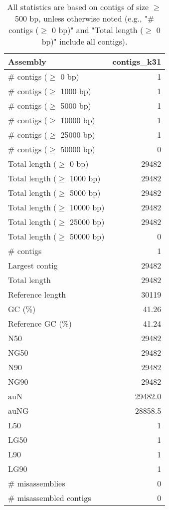 \documentclass[12pt,a4paper]{article}
\begin{document}
\begin{table}[ht]
\begin{center}
\caption{All statistics are based on contigs of size $\geq$ 500 bp, unless otherwise noted (e.g., "\# contigs ($\geq$ 0 bp)" and "Total length ($\geq$ 0 bp)" include all contigs).}
\begin{tabular}{|l*{1}{|r}|}
\hline
Assembly & contigs\_k31 \\ \hline
\# contigs ($\geq$ 0 bp) & 1 \\ \hline
\# contigs ($\geq$ 1000 bp) & 1 \\ \hline
\# contigs ($\geq$ 5000 bp) & 1 \\ \hline
\# contigs ($\geq$ 10000 bp) & 1 \\ \hline
\# contigs ($\geq$ 25000 bp) & 1 \\ \hline
\# contigs ($\geq$ 50000 bp) & 0 \\ \hline
Total length ($\geq$ 0 bp) & 29482 \\ \hline
Total length ($\geq$ 1000 bp) & 29482 \\ \hline
Total length ($\geq$ 5000 bp) & 29482 \\ \hline
Total length ($\geq$ 10000 bp) & 29482 \\ \hline
Total length ($\geq$ 25000 bp) & 29482 \\ \hline
Total length ($\geq$ 50000 bp) & 0 \\ \hline
\# contigs & 1 \\ \hline
Largest contig & 29482 \\ \hline
Total length & 29482 \\ \hline
Reference length & 30119 \\ \hline
GC (\%) & 41.26 \\ \hline
Reference GC (\%) & 41.24 \\ \hline
N50 & 29482 \\ \hline
NG50 & 29482 \\ \hline
N90 & 29482 \\ \hline
NG90 & 29482 \\ \hline
auN & 29482.0 \\ \hline
auNG & 28858.5 \\ \hline
L50 & 1 \\ \hline
LG50 & 1 \\ \hline
L90 & 1 \\ \hline
LG90 & 1 \\ \hline
\# misassemblies & 0 \\ \hline
\# misassembled contigs & 0 \\ \hline

\end{tabular}
\end{center}
\end{table}
\end{document}
